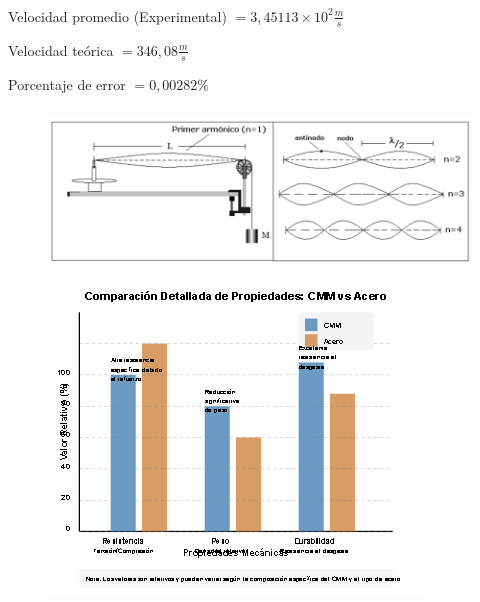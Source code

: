 \documentclass[twocolumn, 12pt]{article}
\begin{document}
\subsubsection{}

\subsubsection{}

Velocidad promedio \hfill{} \break{} (Experimental) $=
    3,45113 \times 10^{2} \frac{m}{s}$

\smallskip

Velocidad teórica $= 346,08 \frac{m}{s}$

\smallskip

Porcentaje de error $= 0,00282\%$

\subsubsection{}

\begin{figure}[H]
    \includegraphics[width=\linewidth]{./Images/Imagen1.png}
    \caption{}
\end{figure}

\begin{figure}[H]
    \includegraphics[width=\linewidth]{./Images/Imagen2.png}
    \caption{}
\end{figure}
\end{document}
